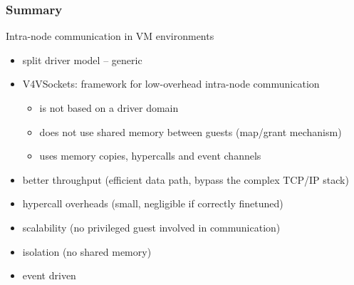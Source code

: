 \documentclass[red,slidestop,notes,compress,mathserif]{beamer}
\begin{document}
\begin{frame}
\frametitle{Summary}
\begin{block}{Intra-node communication in VM environments}
\begin{itemize}
\item split driver model -- generic
\item V4VSockets: framework for low-overhead intra-node communication
\begin{itemize}
\item is not based on a driver domain
\item does not use shared memory between guests (map/grant mechanism)
\item uses memory copies, hypercalls and event channels
\end{itemize}
\end{itemize}
\end{block}
\begin{itemize}
\item better throughput (efficient data path, bypass the complex TCP/IP stack)
\item hypercall overheads (small, negligible if correctly finetuned)
\item scalability (no privileged guest involved in communication)
\item isolation (no shared memory)
\item event driven%
\end{itemize}
\end{frame}
\end{document}
